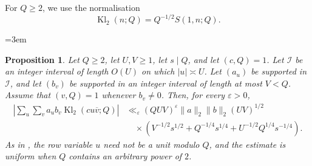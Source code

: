 \documentclass[12pt, a4paper]{amsart}
\numberwithin{equation}{section}
\newcommand{\ep}{\varepsilon}
\renewcommand{\bar}[1]{\overline{#1}}
\renewcommand{\ge}{\geqslant}
\theoremstyle{plain}
\newtheorem{prop}[lem]{Proposition}
\begin{document}
For $Q\ge2$, we use the normalisation
$$
\operatorname{Kl}_2(n;Q)=Q^{-1/2}S(1,n;Q).
$$

\begingroup
{}
\emergencystretch=3em
\begin{prop}\label{prop:reciprocal-factorable}
Let $Q\ge2$, let $U,V\ge1$, let $s\mid Q$, and let $(c,Q)=1$. Let $\mathcal I$ be an integer interval of length $O(U)$ on which $|u|\asymp U$. Let $(a_u)$ be supported in $\mathcal I$, and let $(b_v)$ be supported in an integer interval of length at most $V<Q$. Assume that $(v,Q)=1$ whenever $b_v\ne0$. Then, for every $\ep>0$,
\begin{equation}\label{eq:reciprocal-factorable}
\begin{aligned}
\left|\sum_u\sum_v a_ub_v\operatorname{Kl}_2(cu\bar v;Q)\right|
&\ll_\ep (QUV)^\ep\|a\|_2\|b\|_2(UV)^{1/2}\\
&\quad\times\left(
 V^{-1/2}s^{1/2}
+Q^{-1/4}s^{1/4}
+U^{-1/2}Q^{1/4}s^{-1/4}\right).
\end{aligned}
\end{equation}
As in \cite[Theorem~2.1]{MQW}, the row variable $u$ need not be a unit modulo $Q$, and the estimate is uniform when $Q$ contains an arbitrary power of $2$.
\end{prop}
\end{document}
